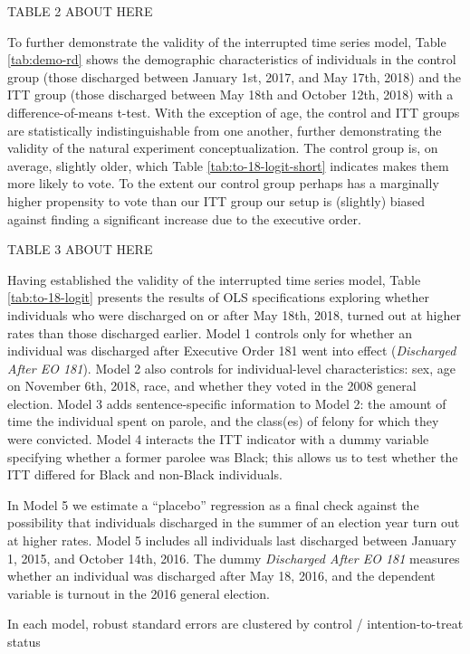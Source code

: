\documentclass[
  12pt,
]{article}
\begin{document}
TABLE 2 ABOUT HERE

To further demonstrate the validity of the interrupted time series model, Table \ref{tab:demo-rd} shows the demographic characteristics of individuals in the control group (those discharged between January 1st, 2017, and May 17th, 2018) and the ITT group (those discharged between May 18th and October 12th, 2018) with a difference-of-means t-test. With the exception of age, the control and ITT groups are statistically indistinguishable from one another, further demonstrating the validity of the natural experiment conceptualization. The control group is, on average, slightly older, which Table \ref{tab:to-18-logit-short} indicates makes them more likely to vote. To the extent our control group perhaps has a marginally higher propensity to vote than our ITT group our setup is (slightly) biased against finding a significant increase due to the executive order.

TABLE 3 ABOUT HERE

Having established the validity of the interrupted time series model, Table \ref{tab:to-18-logit} presents the results of OLS specifications exploring whether individuals who were discharged on or after May 18th, 2018, turned out at higher rates than those discharged earlier. Model 1 controls only for whether an individual was discharged after Executive Order 181 went into effect (\emph{Discharged After EO 181}). Model 2 also controls for individual-level characteristics: sex, age on November 6th, 2018, race, and whether they voted in the 2008 general election. Model 3 adds sentence-specific information to Model 2: the amount of time the individual spent on parole, and the class(es) of felony for which they were convicted. Model 4 interacts the ITT indicator with a dummy variable specifying whether a former parolee was Black; this allows us to test whether the ITT differed for Black and non-Black individuals.

In Model 5 we estimate a ``placebo'' regression as a final check against the possibility that individuals discharged in the summer of an election year turn out at higher rates. Model 5 includes all individuals last discharged between January 1, 2015, and October 14th, 2016. The dummy \emph{Discharged After EO 181} measures whether an individual was discharged after May 18, 2016, and the dependent variable is turnout in the 2016 general election.

In each model, robust standard errors are clustered by control / intention-to-treat status
\end{document}
